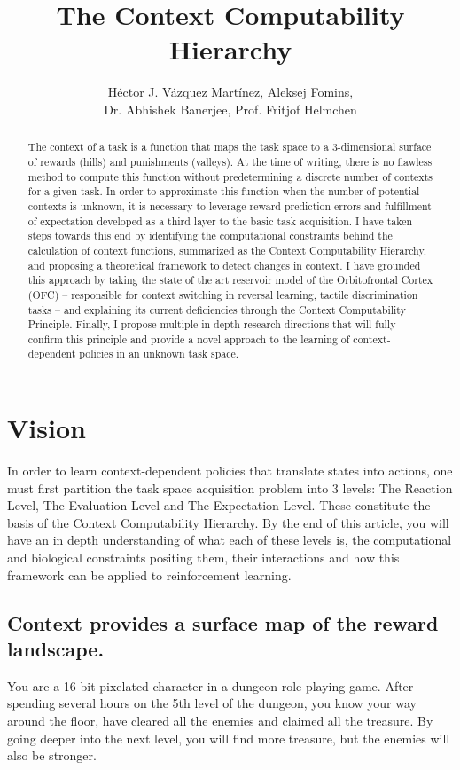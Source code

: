 \documentclass[]{article}
\title{The Context Computability Hierarchy}
\author{H\'ector J. V\'azquez Mart\'inez, Aleksej Fomins,\\
	 Dr. Abhishek Banerjee, Prof. Fritjof Helmchen}
\begin{document}
\maketitle

\begin{abstract}
The context of a task is a function that maps the task space to a 3-dimensional surface of rewards (hills) and punishments (valleys).  At the time of writing, there is no flawless method to compute this function without predetermining a discrete number of contexts for a given task.  In order to approximate this function when the number of potential contexts is unknown, it is necessary to leverage reward prediction errors and fulfillment of expectation developed as a third layer to the basic task acquisition.  I have taken steps towards this end by identifying the computational constraints behind the calculation of context functions, summarized as the Context Computability Hierarchy, and proposing a theoretical framework to detect changes in context.  I have grounded this approach by taking the state of the art reservoir model of the Orbitofrontal Cortex (OFC) -- responsible for context switching in reversal learning, tactile discrimination tasks -- and explaining its current deficiencies through the Context Computability Principle.  Finally, I propose multiple in-depth research directions that will fully confirm this principle and provide a novel approach to the learning of context-dependent policies in an unknown task space.
\end{abstract}


\section{Vision}
In order to learn context-dependent policies that translate states into actions, one must first partition the task space acquisition problem into 3 levels: The Reaction Level, The Evaluation Level and The Expectation Level.  These constitute the basis of the Context Computability Hierarchy.  By the end of this article, you will have an in depth understanding of what each of these levels is, the computational and biological constraints positing them, their interactions and how this framework can be applied to reinforcement learning.

\subsection{Context provides a surface map of the reward landscape.}
You are a 16-bit pixelated character in a dungeon role-playing game.  After spending several hours on the 5th level of the dungeon, you know your way around the floor, have cleared all the enemies and claimed all the treasure.  By going deeper into the next level, you will find more treasure, but the enemies will also be stronger.
\end{document}

